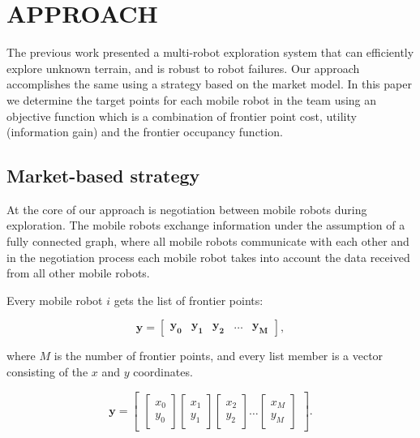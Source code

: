 \section{APPROACH}
The previous work presented a multi-robot exploration system that can efficiently explore unknown terrain, and is robust to robot failures. Our approach accomplishes the same using a strategy based on the market model. 
In this paper we determine the target points for each mobile robot in the team using an objective function which is a combination of frontier point cost, utility (information gain) and the frontier occupancy function. 

\subsection{Market-based strategy} 

At the core of our approach is negotiation between mobile robots during exploration. The mobile robots exchange information under the assumption of a fully connected graph, where all mobile robots communicate with each other and in the negotiation process each mobile robot takes into account the data received from all other mobile robots.

Every mobile robot $i$ gets the list of frontier points:

\begin{equation}
   \boldsymbol{y}=\begin{bmatrix}
    \boldsymbol{y_{0}} & \boldsymbol{y_{1}} & \boldsymbol{y_{2}} & \hdots & \boldsymbol{y_{M}}
\end{bmatrix},
\end{equation}

where $M$ is  the number of frontier points, and every list member is a vector consisting of the $x$ and $y$ coordinates. 

\begin{equation}
   \boldsymbol{y}=\begin{bmatrix}
   \begin{bmatrix}
           x_{0} \\
           y_{0} 
   \end{bmatrix}
    \begin{bmatrix}
         x_{1} \\
         y_{1} 
    \end{bmatrix}
    \begin{bmatrix}
         x_{2} \\
         y_{2} 
    \end{bmatrix}
    \hdots
    \begin{bmatrix}
         x_{M} \\
         y_{M} 
    \end{bmatrix}
\end{bmatrix}.
\end{equation}


